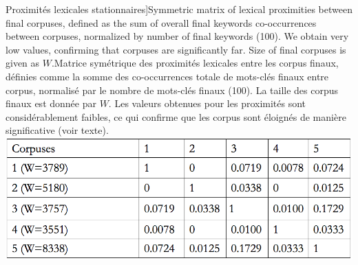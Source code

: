 \begin{table}
\caption[Stationary lexical proximities][Proximités lexicales stationnaires]{Symmetric matrix of lexical proximities between final corpuses, defined as the sum of overall final keywords co-occurrences between corpuses, normalized by number of final keywords (100). We obtain very low values, confirming that corpuses are significantly far. Size of final corpuses is given as $W$.\label{tab:quantepistemo:lexical}}{Matrice symétrique des proximités lexicales entre les corpus finaux, définies comme la somme des co-occurrences totale de mots-clés finaux entre corpus, normalisé par le nombre de mots-clés finaux (100). La taille des corpus finaux est donnée par $W$. Les valeurs obtenues pour les proximités sont considérablement faibles, ce qui confirme que les corpus sont éloignés de manière significative (voir texte).\label{tab:quantepistemo:lexical}}
\includegraphics[width=0.8\linewidth]{Figures/QuantEpistemo/corpusesDistances}
\end{table}







